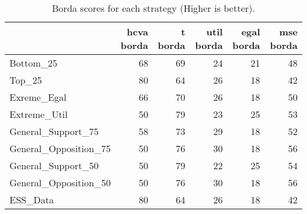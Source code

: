 \begin{table}
\caption{Borda scores for each strategy (Higher is better).}
\begin{tabular}{lrrrrr}
\toprule
 & hcva borda & t borda & util borda & egal borda & mse borda \\
\midrule
Bottom_25 & 68 & 69 & 24 & 21 & 48 \\
Top_25 & 80 & 64 & 26 & 18 & 42 \\
Exreme_Egal & 66 & 70 & 26 & 18 & 50 \\
Extreme_Util & 50 & 79 & 23 & 25 & 53 \\
General_Support_75 & 58 & 73 & 29 & 18 & 52 \\
General_Opposition_75 & 50 & 76 & 30 & 18 & 56 \\
General_Support_50 & 50 & 79 & 22 & 25 & 54 \\
General_Opposition_50 & 50 & 76 & 30 & 18 & 56 \\
ESS_Data & 80 & 64 & 26 & 18 & 42 \\
\bottomrule
\end{tabular}
\end{table}
